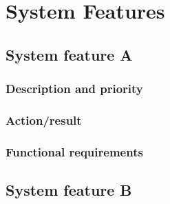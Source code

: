 \documentclass[10pt]{article}
\begin{document}










\section{System Features}

\subsection{System feature A}

\lipsum[10]

\subsubsection{Description and priority}

\lipsum[10]

\subsubsection{Action/result}

\lipsum[10]

\subsubsection{ Functional requirements}

\lipsum[10]








\subsection{System feature B}
\end{document}
